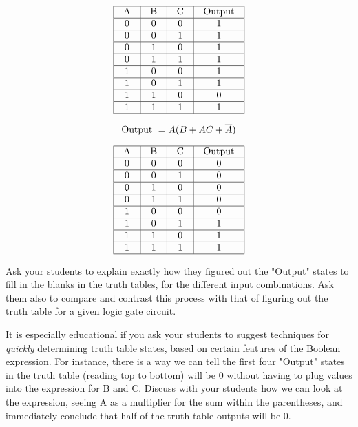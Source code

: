 $$\vbox{\offinterlineskip
\halign{\strut
\vrule \quad\hfil # \ \hfil & 
\vrule \quad\hfil # \ \hfil & 
\vrule \quad\hfil # \ \hfil & 
\vrule \quad\hfil # \ \hfil \vrule \cr
\noalign{\hrule}
%
A & B & C & Output \cr
%
\noalign{\hrule}
%
0 & 0 & 0 & 1 \cr
%
\noalign{\hrule}
%
0 & 0 & 1 & 1 \cr
%
\noalign{\hrule}
%
0 & 1 & 0 & 1 \cr
%
\noalign{\hrule}
%
0 & 1 & 1 & 1 \cr
%
\noalign{\hrule}
%
1 & 0 & 0 & 1 \cr
%
\noalign{\hrule}
%
1 & 0 & 1 & 1 \cr
%
\noalign{\hrule}
%
1 & 1 & 0 & 0 \cr
%
\noalign{\hrule}
%
1 & 1 & 1 & 1 \cr
%
\noalign{\hrule}
} %
}$$ %

\vskip 20pt


$$\hbox{Output } = A(B + AC + \overline{A})$$

$$\vbox{\offinterlineskip
\halign{\strut
\vrule \quad\hfil # \ \hfil & 
\vrule \quad\hfil # \ \hfil & 
\vrule \quad\hfil # \ \hfil & 
\vrule \quad\hfil # \ \hfil \vrule \cr
\noalign{\hrule}
%
A & B & C & Output \cr
%
\noalign{\hrule}
%
0 & 0 & 0 & 0 \cr
%
\noalign{\hrule}
%
0 & 0 & 1 & 0 \cr
%
\noalign{\hrule}
%
0 & 1 & 0 & 0 \cr
%
\noalign{\hrule}
%
0 & 1 & 1 & 0 \cr
%
\noalign{\hrule}
%
1 & 0 & 0 & 0 \cr
%
\noalign{\hrule}
%
1 & 0 & 1 & 1 \cr
%
\noalign{\hrule}
%
1 & 1 & 0 & 1 \cr
%
\noalign{\hrule}
%
1 & 1 & 1 & 1 \cr
%
\noalign{\hrule}
} %
}$$ %








Ask your students to explain exactly how they figured out the "Output" states to fill in the blanks in the truth tables, for the different input combinations.  Ask them also to compare and contrast this process with that of figuring out the truth table for a given logic gate circuit.

It is especially educational if you ask your students to suggest techniques for {\it quickly} determining truth table states, based on certain features of the Boolean expression.  For instance, there is a way we can tell the first four "Output" states in the truth table (reading top to bottom) will be 0 without having to plug values into the expression for B and C.  Discuss with your students how we can look at the expression, seeing A as a multiplier for the sum within the parentheses, and immediately conclude that half of the truth table outputs will be 0.




